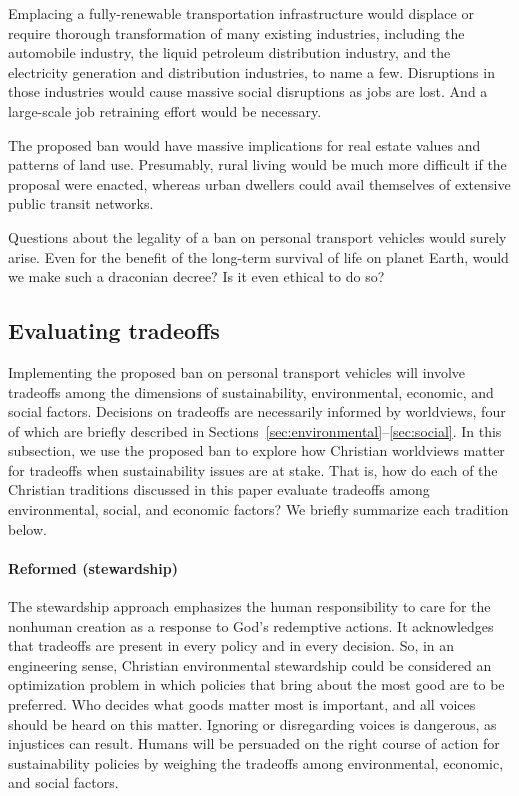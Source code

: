 \documentclass[12pt]{article}
\begin{document}
Emplacing a fully-renewable transportation infrastructure 
would displace or require thorough transformation of many existing industries, including 
the automobile industry, 
the liquid petroleum distribution industry, and
the electricity generation and distribution industries,
to name a few.
Disruptions in those industries 
would cause massive social disruptions 
as jobs are lost.
And a large-scale job retraining effort would be necessary.

The proposed ban would have massive implications for real estate values 
and patterns of land use. 
Presumably, rural living would be much more difficult if the proposal were enacted,
whereas urban dwellers could avail themselves of extensive public transit networks.

Questions about the legality of a ban on personal transport vehicles would surely arise.  
Even for the benefit of the long-term survival of life on planet Earth,
would we make such a draconian decree? 
Is it even ethical to do so?


\subsection{Evaluating tradeoffs}
\label{sec:evaluating_tradeoffs}

Implementing the proposed ban on personal transport vehicles
will involve tradeoffs among the dimensions of sustainability, 
environmental, economic, and social factors.
Decisions on tradeoffs are necessarily informed by worldviews,
four of which are briefly described 
in Sections~\ref{sec:environmental}--\ref{sec:social}.
In this subsection, 
we use the proposed ban to explore how Christian worldviews matter 
for tradeoffs when sustainability issues are at stake.
That is, how do each of the Christian traditions discussed in this paper 
evaluate tradeoffs among environmental, social, and economic factors?
We briefly summarize each tradition below.

\paragraph{Reformed (stewardship)} 

The stewardship approach emphasizes the human responsibility 
to care for the nonhuman creation
as a response to God's redemptive actions.
It acknowledges that tradeoffs 
are present in every policy and in every decision. 
So, in an engineering sense, 
Christian environmental stewardship could be considered an optimization problem
in which policies that bring about the most good 
are to be preferred.
Who decides what goods matter most is important, and 
all voices should be heard on this matter.
Ignoring or disregarding voices is dangerous,
as injustices can result. 
Humans will be persuaded on the right course of action
for sustainability policies by weighing the tradeoffs 
among environmental, economic, and social factors.
\end{document}

